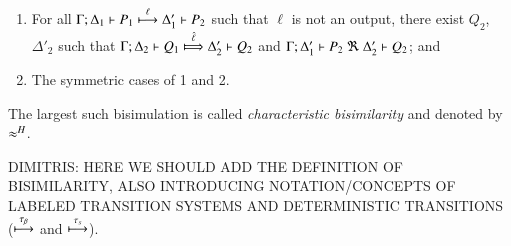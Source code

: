 {\begin{definition}
\begin{enumerate}[1)]
			\item	For all $\Gamma; \Delta_1 \vdash P_1 \stackrel{\ell}{\longmapsto} \Delta_1' \vdash P_2$ such that 
					$\ell$ is not an output, there exist $Q_2$, $\Delta'_2$ such that 
					$\horel{\Gamma}{\Delta_2}{Q_1}{\Hby{\hat{\ell}}}{\Delta_2'}{Q_2}$
					and $\horel{\Gamma}{\Delta_1'}{P_2}{\ \Re \ }{\Delta_2'}{Q_2}$; and 

            \item	The symmetric cases of 1 and 2.
	\end{enumerate}
	The largest such bisimulation is called \emph{characteristic bisimilarity} and denoted by $\approx^H$.
\end{definition}
}

DIMITRIS: HERE WE SHOULD ADD THE DEFINITION OF BISIMILARITY, ALSO INTRODUCING NOTATION/CONCEPTS OF LABELED TRANSITION SYSTEMS
AND DETERMINISTIC TRANSITIONS ($\stackrel{\tau_{\beta}}{\longmapsto}$ and $\stackrel{\tau_{s}}{\longmapsto}$).


